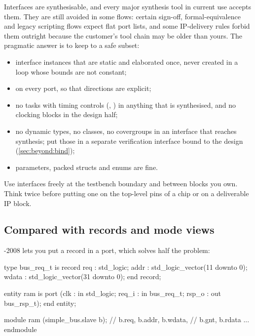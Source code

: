 Interfaces are synthesisable, and every major synthesis tool in current use
accepts them. They are still avoided in some flows: certain sign-off,
formal-equivalence and legacy scripting flows expect flat port lists, and some
IP-delivery rules forbid them outright because the customer's tool chain may
be older than yours. The pragmatic answer is to keep to a safe subset:

\begin{itemize}
  \item interface instances that are static and elaborated once, never created
        in a  loop whose bounds are not constant;
  \item {} on every port, so that directions are explicit;
  \item no tasks with timing controls (, \code{\#}) in anything that
        is synthesised, and no clocking blocks in the design half;
  \item no dynamic types, no classes, no covergroups in an interface that
        reaches synthesis; put those in a separate verification interface
        bound to the design (\cref{sec:beyond:bind});
  \item parameters, packed structs and enums are fine.
\end{itemize}

\begin{ruleofthumb}
Use interfaces freely at the testbench boundary and between blocks you own.
Think twice before putting one on the top-level pins of a chip or on a
deliverable IP block.
\end{ruleofthumb}

\subsection{Compared with \VHDL{} records and mode views}

\VHDL{}-2008 lets you put a record in a port, which solves half the problem:

\begin{rosetta}
\begin{rleft}
type bus_req_t is record
  req   : std_logic;
  addr  : std_logic_vector(11 downto 0);
  wdata : std_logic_vector(31 downto 0);
end record;

entity ram is
  port (clk   : in  std_logic;
        req_i : in  bus_req_t;
        rsp_o : out bus_rsp_t);
end entity;
\end{rleft}
\begin{rright}
module ram (simple_bus.slave b);
  // b.req, b.addr, b.wdata,
  // b.gnt, b.rdata ...
endmodule
\end{rright}
\end{rosetta}

